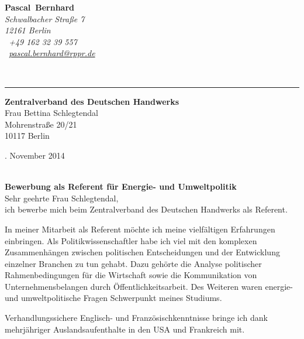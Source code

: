 \documentclass[11pt,a4paper]{article}
\def\firstname{Pascal}
\def\familyname{Bernhard}
\begin{document}
\sffamily   %
\hfill%
\begin{minipage}[t]{.6\textwidth}
	\raggedleft%
	{\bfseries {\color{firstnamecolor}\firstname}~{\color{familynamecolor}\familyname}}\\[.35ex]
	\small\itshape%
	Schwalbacher Straße 7\\
	12161 Berlin\\[.35ex]
	\Mobilefone~+49 162 32 39 557 \\
	\Letter~\href{mailto:pascal.bernhard@rppr.de}{pascal.bernhard@rppr.de}
\end{minipage}\\[0.5em]
%
{\color{firstnamecolor}\rule{\textwidth}{.25ex}}
%
\begin{minipage}[t]{.4\textwidth}
	\raggedright%
	\vspace*{1em}
	\textbf{Zentralverband des Deutschen Handwerks}\\
	Frau Bettina Schlegtendal \\[.35ex]
	\small%
	Mohrenstraße 20/21\\
	10117 Berlin
\end{minipage}
%
\hfill
%
\begin{minipage}[t]{.4\textwidth}
	. November 2014
\end{minipage}\\[1em]


{\bfseries \color{familynamecolor}Bewerbung als Referent für Energie- und Umweltpolitik}\\[0.75em]

Sehr geehrte Frau Schlegtendal,\\[0.5em]
%
ich bewerbe mich beim Zentralverband des Deutschen Handwerks als Referent.

In meiner Mitarbeit als Referent möchte ich meine vielfältigen Erfahrungen einbringen. Als Politikwissenschaftler habe ich viel mit den komplexen Zusammen­hängen zwischen politischen Entscheidungen und der Entwicklung einzelner Branchen zu tun gehabt. Dazu gehörte die Analyse politischer Rahmenbedingungen für die Wirtschaft sowie die Kommunikation von Unternehmensbelangen durch Öffentlichkeitsarbeit. Des Weiteren waren energie- und umweltpolitische Fragen Schwerpunkt meines Studiums.

Verhandlungssichere Englisch- und Französischkenntnisse bringe ich dank mehrjähriger Auslandsaufenthalte in den USA und Frankreich mit.
\end{document}
